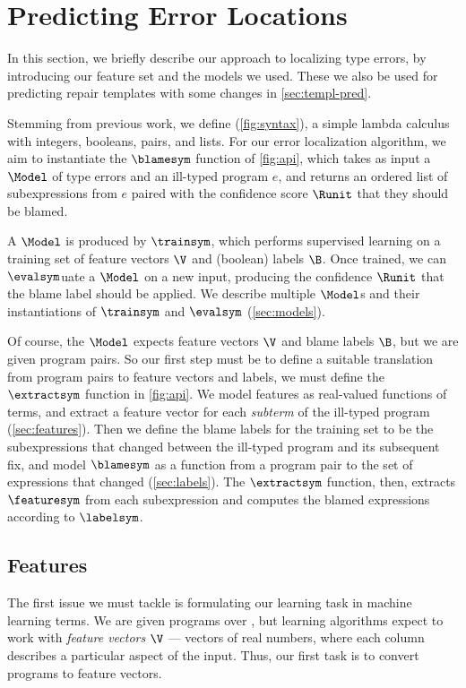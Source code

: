 
\section{Predicting Error Locations}
\label{sec:localization}

In this section, we briefly describe our approach to localizing type errors, by
introducing our feature set and the models we used. These we also be used for
predicting repair templates with some changes in \autoref{sec:templ-pred}.

Stemming from previous work, we define \lang (\autoref{fig:syntax}), a simple
lambda calculus with integers, booleans, pairs, and lists. For our error
localization algorithm, we aim to instantiate the $\blamesym$ function of
\autoref{fig:api}, which takes as input a $\Model$ of type errors and an
ill-typed program $e$, and returns an ordered list of subexpressions from $e$
paired with the confidence score $\Runit$ that they should be blamed.

A $\Model$ is produced by $\trainsym$, which performs supervised learning on a
training set of feature vectors $\V$ and (boolean) labels $\B$. Once trained, we
can $\evalsym$uate a $\Model$ on a new input, producing the confidence $\Runit$
that the blame label should be applied. We describe multiple $\Model$s and their
instantiations of $\trainsym$ and $\evalsym$ (\autoref{sec:models}).

Of course, the $\Model$ expects feature vectors $\V$ and blame labels $\B$, but
we are given program pairs. So our first step must be to define a suitable
translation from program pairs to feature vectors and labels, \ie we must define
the $\extractsym$ function in \autoref{fig:api}. We model features as
real-valued functions of terms, and extract a feature vector for each
\emph{subterm} of the ill-typed program (\autoref{sec:features}). Then we define
the blame labels for the training set to be the subexpressions that changed
between the ill-typed program and its subsequent fix, and model $\blamesym$ as a
function from a program pair to the set of expressions that changed
(\autoref{sec:labels}). The $\extractsym$ function, then, extracts $\featuresym$
from each subexpression and computes the blamed expressions according to
$\labelsym$.




\subsection{Features}
\label{sec:features}
The first issue we must tackle is formulating our learning task in machine
learning terms. We are given programs over \lang, but learning algorithms expect
to work with \emph{feature vectors} $\V$ --- vectors of real numbers, where each
column describes a particular aspect of the input. Thus, our first task is to
convert programs to feature vectors.

